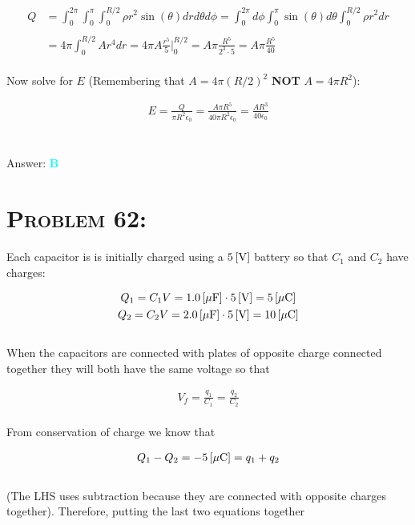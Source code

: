 \documentclass{article}
\begin{document}
\begin{align}
Q &= \int^{2\pi}_{0} \int^{\pi}_{0} \int^{R/2}_{0}{\rho r^{2} \sin{(\theta)} dr d\theta d\phi} 
%
=  \int^{2\pi}_{0}{d\phi}      \int^{\pi}_{0}{\sin{(\theta)}d\theta}      \int^{R/2}_{0}{\rho r^{2} dr} \nonumber\\
%
\nonumber\\
%
&= 4\pi \int^{R/2}_{0}{A r^{4}dr} = 4 \pi A  \frac{r^{5}}{5} \biggr\rvert^{R/2}_{0} = A \pi \frac{R^{5}}{2^{3} \cdot 5} = A \pi \frac{R^{5}}{40}\nonumber
\end{align}
\\
Now solve for $E$ (Remembering that $A = 4 \pi (R/2)^{2}$ \textbf{NOT} $A = 4 \pi R^{2}$):

\begin{gather}
E = \frac{Q}{ \pi R^{2}\epsilon_{0}} =  \frac{A \pi R^{5}}{40 \pi R^{2}\epsilon_{0}} = \boxed{\frac{A R^{3}}{40 \epsilon_{0}}}\nonumber
\end{gather}
\\\\
Answer: \textbf{\textcolor{cyan}B}\\


\section{\textsc{Problem 62:}} Each capacitor is is initially charged using a $\unit[5]{[V]}$ battery so that $C_{1}$ and $C_{2}$ have charges:

\begin{gather}
Q_{1} = C_{1} V = \unit[1.0]{[\mu F]} \cdot \unit[5]{[V]} = \unit[5]{[\mu C]}\nonumber\\
Q_{2} = C_{2} V = \unit[2.0]{[\mu F]} \cdot \unit[5]{[V]} = \unit[10]{[\mu C]}\nonumber
\end{gather}
\\
When the capacitors are connected with plates of opposite charge connected together they will both have the same voltage so that 

\begin{gather}
V_{f} = \frac{q_{1}}{C_{1}} = \frac{q_{2}}{C_{2}}\nonumber
\end{gather}
\\
From conservation of charge we know that 

\begin{gather}
Q_{1} - Q_{2} = \unit[-5]{[\mu C]} =  q_{1} + q_{2}\nonumber
\end{gather}
\\
(The LHS uses subtraction because they are connected with opposite charges together). Therefore, putting the last two equations together
\end{document}
